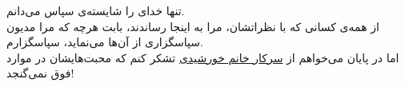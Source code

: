 تنها خدای را شایسته‌ی سپاس می‌دانم. \\

\noindent
از همه‌ی کسانی که با نظراتشان، مرا به اینجا رساندند، بابت هرچه که مرا مدیون سپاسگزاری از آن‌ها می‌نماید، سپاسگزارم. \\

\noindent
اما در پایان می‌خواهم از \underline{سرکار خانم خورشیدی} تشکر کنم که محبت‌هایشان در موارد فوق نمی‌گنجد!
